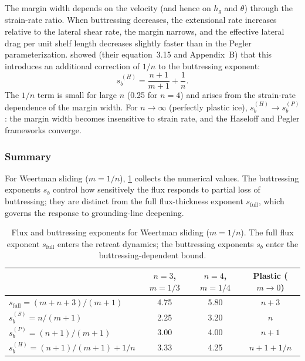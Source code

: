 \documentclass[11pt]{article}
\newcommand{\hg}{h_g}
\begin{document}
The margin width depends on the velocity (and hence on $\hg$ and $\theta$) through the strain-rate ratio.  When buttressing decreases, the extensional rate increases relative to the lateral shear rate, the margin narrows, and the effective lateral drag per unit shelf length decreases slightly faster than in the Pegler parameterization.  \citet{HaseloffSergienko2018} showed (their equation~3.15 and Appendix~B) that this introduces an additional correction of $1/n$ to the buttressing exponent:
\begin{equation}
	\boxed{s_b^{\,(H)} = \frac{n+1}{m+1} + \frac{1}{n}.}
	\label{eq:sb_haseloff}
\end{equation}
The $1/n$ term is small for large $n$ (0.25 for $n = 4$) and arises from the strain-rate dependence of the margin width.  For $n \to \infty$ (perfectly plastic ice), $s_b^{(H)} \to s_b^{(P)}$: the margin width becomes insensitive to strain rate, and the Haseloff and Pegler frameworks converge.

\subsubsection{Summary}

For Weertman sliding ($m = 1/n$), \cref{tab:exponents} collects the numerical values. The buttressing exponents $s_b$ control how sensitively the flux responds to partial loss of buttressing; they are distinct from the full flux-thickness exponent $s_{\mathrm{full}}$, which governs the response to grounding-line deepening.

\begin{table}[ht]
\centering
\caption{Flux and buttressing exponents for Weertman sliding ($m = 1/n$). The full flux exponent $s_{\mathrm{full}}$ enters the retreat dynamics; the buttressing exponents $s_b$ enter the buttressing-dependent bound.}
\label{tab:exponents}
\smallskip
\begin{tabular}{l c c c}
\toprule
& $n = 3$, $m = 1/3$ & $n = 4$, $m = 1/4$ & Plastic ($m\to0$) \\
\midrule
$s_{\mathrm{full}} = (m+n+3)/(m+1)$ & 4.75 & 5.80 & $n+3$ \\[4pt]
$s_b^{(S)} = n/(m+1)$ & 2.25 & 3.20 & $n$ \\
$s_b^{(P)} = (n+1)/(m+1)$ & 3.00 & 4.00 & $n+1$ \\
$s_b^{(H)} = (n+1)/(m+1) + 1/n$ & 3.33 & 4.25 & $n+1+1/n$ \\
\bottomrule
\end{tabular}
\end{table}
\end{document}
